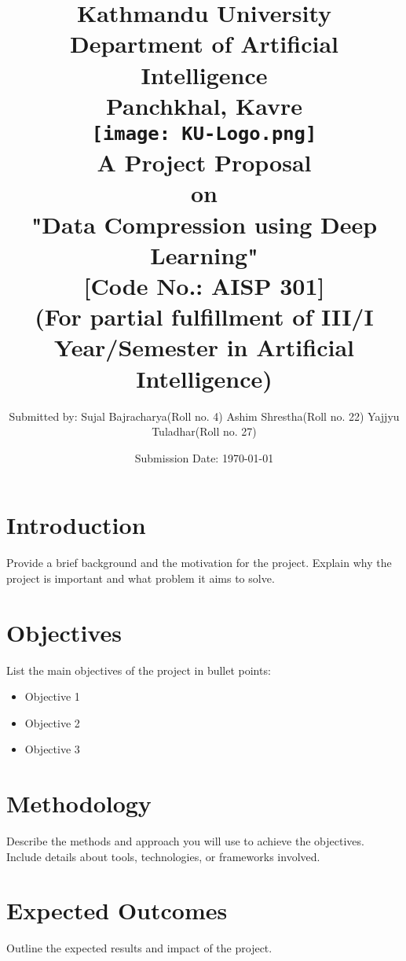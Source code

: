 \documentclass[a4paper,12pt]{article}
\title{
\textbf{
    Kathmandu University \\
    \large{Department of Artificial Intelligence}\\
    \normalsize{Panchkhal, Kavre}\\[2cm]}
    \texttt{[image: KU-Logo.png]}\\[2cm]
    \normalsize{A Project Proposal\\on\\
    \textbf{"Data Compression using Deep Learning"}}\\[0.5cm]
    \normalsize{[Code No.: AISP 301]\\
    (For partial fulfillment of III/I Year/Semester in Artificial Intelligence)}\\[2cm]
}
\author[ ]{\normalsize{
        Submitted by: \linebreak
        Sujal Bajracharya(Roll no. 4)\linebreak
        Ashim Shrestha(Roll no. 22)\linebreak
        Yajjyu Tuladhar(Roll no. 27)
}}
\affil[ ]{\vspace{1.5cm}}
\affil[ ]{\normalsize{
        Submitted to: \linebreak
        Subodh Acharya \linebreak
        Department of Artificial Intelligence
}}
\affil[ ]{}
\date{\normalsize{Submission Date: \today}}
\begin{document}
\maketitle
\thispagestyle{empty}
\restoregeometry

\newpage
\setcounter{page}{1}

\section{Introduction}
Provide a brief background and the motivation for the project. Explain why the project is important and what problem it aims to solve.

\section{Objectives}
List the main objectives of the project in bullet points:
\begin{itemize}
    \item Objective 1
    \item Objective 2
    \item Objective 3
\end{itemize}

\section{Methodology}
Describe the methods and approach you will use to achieve the objectives. Include details about tools, technologies, or frameworks involved.

\section{Expected Outcomes}
Outline the expected results and impact of the project.
\end{document}
